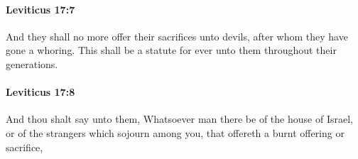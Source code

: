		\paragraph{Leviticus 17:7} %
			\label{LEVITICUS-17-7}

			And they shall no more offer their sacrifices unto devils, after whom they have gone a whoring. This shall be a statute for ever unto them throughout their generations.


		\paragraph{Leviticus 17:8} %
			\label{LEVITICUS-17-8}

			And thou shalt say unto them, Whatsoever man there be of the house of Israel, or of the strangers which sojourn among you, that offereth a burnt offering or sacrifice,


